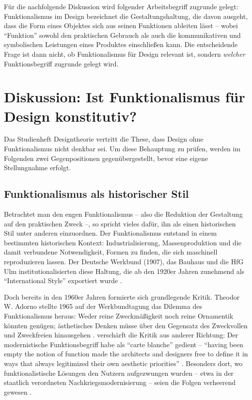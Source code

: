\documentclass[
    a4paper,
    11pt,
    bibliography=totoc,
    listof=totoc,
    parskip=half,
    headings=normal
]{scrbook}
\begin{document}
Für die nachfolgende Diskussion wird folgender Arbeitsbegriff zugrunde gelegt: Funktionalismus im Design bezeichnet die Gestaltungshaltung, die davon ausgeht, dass die Form eines Objektes sich aus seinen Funktionen ableiten lässt -- wobei \enquote{Funktion} sowohl den praktischen Gebrauch als auch die kommunikativen und symbolischen Leistungen eines Produktes einschließen kann. Die entscheidende Frage ist dann nicht, ob Funktionalismus für Design relevant ist, sondern \textit{welcher} Funktionsbegriff zugrunde gelegt wird.

\section{Diskussion: Ist Funktionalismus für Design konstitutiv?}

Das Studienheft Designtheorie vertritt die These, dass Design ohne Funktionalismus nicht denkbar sei. Um diese Behauptung zu prüfen, werden im Folgenden zwei Gegenpositionen gegenübergestellt, bevor eine eigene Stellungnahme erfolgt.

\subsection{Funktionalismus als historischer Stil}
Betrachtet man den engen Funktionalismus -- also die Reduktion der Gestaltung auf den praktischen Zweck --, so spricht vieles dafür, ihn als einen historischen Stil unter anderen einzuordnen. Der Funktionalismus entstand in einem bestimmten historischen Kontext: Industrialisierung, Massenproduktion und die damit verbundene Notwendigkeit, Formen zu finden, die sich maschinell reproduzieren lassen. Der Deutsche Werkbund (1907), das Bauhaus und die HfG Ulm institutionalisierten diese Haltung, die ab den 1920er Jahren zunehmend als \enquote{International Style} exportiert wurde \autocite{wikiFunktionalismusDesign2025}.

Doch bereits in den 1960er Jahren formierte sich grundlegende Kritik. Theodor W. Adorno stellte 1965 auf der Werkbundtagung das Dilemma des Funktionalismus heraus: Weder reine Zweckmäßigkeit noch reine Ornamentik könnten genügen; ästhetisches Denken müsse über den Gegensatz des Zweckvollen und Zweckfreien hinausgehen \autocite{wikiFunktionalismusDesign2025}. \citeauthor{michlFormFollowsWhat1995} verschärft die Kritik aus anderer Richtung: Der modernistische Funktionsbegriff habe als \enquote{carte blanche} gedient -- \enquote{having been empty the notion of function made the architects and designers free to define it in ways that always legitimized their own aesthetic priorities} \autocite{michlFormFollowsWhat1995}. Besonders dort, wo funktionalistische Lösungen den Nutzern aufgezwungen wurden -- etwa in der staatlich verordneten Nachkriegsmodernisierung -- seien die Folgen verheerend gewesen \autocite{michlFormFollowsWhat1995}.
\end{document}
